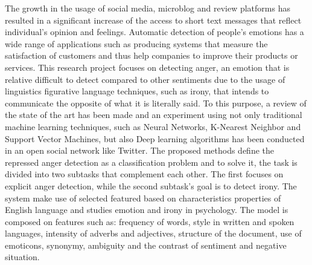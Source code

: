 The growth in the usage of social media, microblog and review platforms has resulted in a significant increase of the access to short text messages that reflect individual's opinion and feelings. Automatic detection of people's emotions has a wide range of applications such as producing systems that measure the satisfaction of customers and thus help companies to improve their products or services. This research project focuses on detecting anger, an emotion that is relative difficult to detect compared to other sentiments due to the usage of linguistics figurative language techniques, such as irony, that intends to communicate the opposite of what it is literally said.
To this purpose, a review of the state of the art has been made and an experiment using not only traditional machine learning techniques, such as Neural Networks, K-Nearest Neighbor and Support Vector Machines, but also Deep learning algorithms has been conducted in an open social network like Twitter.
The proposed methods define the repressed anger detection as a classification problem and to solve it, the task is divided into two subtasks that complement each other. The first focuses on explicit anger detection, while the second subtask's goal is to detect irony. The system make use of selected featured based on characteristics properties of English language and studies emotion and irony in psychology. The model is composed on features such as: frequency of words, style in written and spoken languages, intensity of adverbs and adjectives, structure of the document, use of emoticons, synonymy, ambiguity and the contrast of sentiment and negative situation.

\fi

